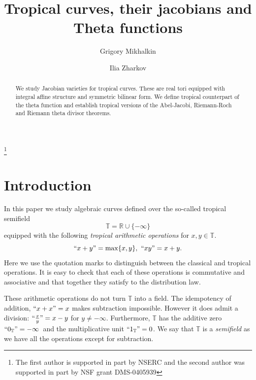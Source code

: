 \documentclass[12pt]{amsart}
\theoremstyle{plain}
\theoremstyle{definition}
\theoremstyle{remark}
\newcommand{\R}{\mathbb R}    %
\newcommand{\T}{\mathbb T}    %
\newcommand{\<}{\langle}   %
\renewcommand{\>}{\rangle} %
\begin{document}
\title[Jacobians of tropical curves]
{Tropical curves, their jacobians
and Theta functions}

\author{Grigory Mikhalkin}
\address{Mathematics Department \\ University of Toronto\\ Toronto, ON M5S 2E4\\ Canada}
\author{Ilia Zharkov}
\address{Max Planck Institut f\"ur Mathematik\\ Vivatsgasse, 7\\ D-53111 Bonn \\ Germany}

\thanks{The first author is supported in part by NSERC and the second author was supported in part by NSF grant DMS-0405939}

\begin{abstract}
We study Jacobian varieties for tropical curves. These are real tori equipped with integral affine structure and symmetric bilinear form. We define tropical counterpart of the theta function and establish tropical versions of the Abel-Jacobi, Riemann-Roch and Riemann theta divisor theorems.
\end{abstract}
\maketitle



\section{Introduction}
In this paper we study algebraic curves defined
over the so-called tropical semifield $$\T=\R\cup\{-\infty\}$$
equipped with the following {\em tropical arithmetic operations} for $x,y\in\T$.
$$``x+y"=\max\{x,y\},\ ``xy"=x+y.$$
Here we use the quotation marks to distinguish between
the classical and tropical operations.
It is easy to check that each of these operations
is commutative and associative and that together
they satisfy to the distribution law.

These arithmetic operations do not turn $\T$ into a field. The
idempotency of addition, $``x+x"=x$ makes subtraction impossible.
However it does admit a division: $``\frac{x}{y}"=x-y$ for
$y\neq-\infty$. Furthermore, $\T$ has the additive zero
$``0_\T"=-\infty$\ and the multiplicative unit $``1_\T"=0$.
We say that $\T$ is a {\em semifield} as we have all the operations
except for subtraction.
\end{document}
